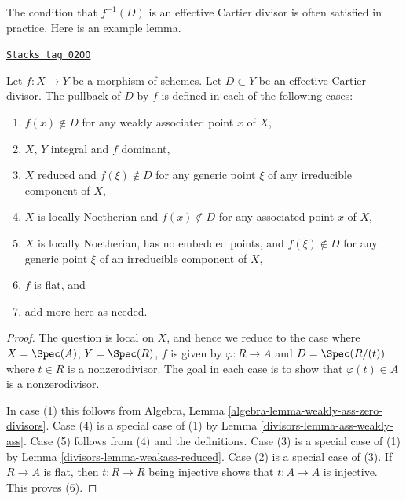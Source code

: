 The condition that $f^{-1}(D)$ is an effective Cartier divisor
is often satisfied in practice. Here is an example lemma.

\begin{lemma}
\label{divisors-lemma-pullback-effective-Cartier-defined}
\href{https://stacks.math.columbia.edu/tag/02OO}{\texttt{Stacks tag 02OO}}

Let $f : X \to Y$ be a morphism of schemes.
Let $D \subset Y$ be an effective Cartier divisor.
The pullback of $D$ by $f$ is defined in each of the following cases:
\begin{enumerate}
\item $f(x) \not \in D$ for any weakly associated point $x$ of $X$,
\item $X$, $Y$ integral and $f$ dominant,
\item $X$ reduced and $f(\xi) \not \in D$ for any generic point $\xi$ of any
irreducible component of $X$,
\item $X$ is locally Noetherian and $f(x) \not \in D$ for any associated point
$x$ of $X$,
\item $X$ is locally Noetherian, has no embedded points, and
$f(\xi) \not \in D$ for any generic point $\xi$ of an irreducible component of
$X$,
\item $f$ is flat, and
\item add more here as needed.
\end{enumerate}
\end{lemma}

\begin{proof}

The question is local on $X$, and hence we reduce to the case
where $X = \Spec(A)$, $Y = \Spec(R)$, $f$ is
given by $\varphi : R \to A$ and
$D = \Spec(R/(t))$ where $t \in R$ is a nonzerodivisor.
The goal in each case is to show that $\varphi(t) \in A$
is a nonzerodivisor.

\medskip\noindent
In case (1) this follows from
Algebra, Lemma \ref{algebra-lemma-weakly-ass-zero-divisors}.
Case (4) is a special case of (1) by Lemma \ref{divisors-lemma-ass-weakly-ass}.
Case (5) follows from (4) and the definitions.
Case (3) is a special case of (1) by
Lemma \ref{divisors-lemma-weakass-reduced}.
Case (2) is a special case of (3).
If $R \to A$ is flat, then $t : R \to R$ being injective
shows that $t : A \to A$ is injective. This proves (6).
\end{proof}

